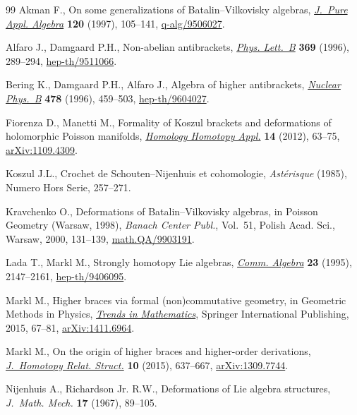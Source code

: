 \documentclass[11pt]{article}
\numberwithin{equation}{section}
\begin{document}
\begin{thebibliography}{99}
Akman F., On some generalizations of {B}atalin--{V}ilkovisky algebras,
 \href{http://dx.doi.org/10.1016/S0022-4049(96)00036-9}{\textit{J.~Pure Appl. Algebra}} \textbf{120} (1997), 105--141,
 \href{http://arxiv.org/abs/q-alg/9506027}{q-alg/9506027}.

Alfaro J., Damgaard P.H., Non-abelian antibrackets, \href{http://dx.doi.org/10.1016/0370-2693(95)01533-7}{\textit{Phys. Lett.~B}}
 \textbf{369} (1996), 289--294, \href{http://arxiv.org/abs/hep-th/9511066}{hep-th/9511066}.

Bering K., Damgaard P.H., Alfaro J., Algebra of higher antibrackets,
 \href{http://dx.doi.org/10.1016/0550-3213(96)00401-4}{\textit{Nuclear Phys.~B}} \textbf{478} (1996), 459--503,
 \href{http://arxiv.org/abs/hep-th/9604027}{hep-th/9604027}.

Fiorenza D., Manetti M., Formality of {K}oszul brackets and deformations of
 holomorphic {P}oisson manifolds, \href{http://dx.doi.org/10.4310/HHA.2012.v14.n2.a4}{\textit{Homology Homotopy Appl.}} \textbf{14}
 (2012), 63--75, \href{http://arxiv.org/abs/1109.4309}{arXiv:1109.4309}.

Koszul J.L., Crochet de {S}chouten--{N}ijenhuis et cohomologie,
 \textit{Ast\'erisque} (1985), {N}umero Hors Serie, 257--271.

Kravchenko O., Deformations of {B}atalin--{V}ilkovisky algebras, in Poisson
 {G}eometry ({W}arsaw, 1998), \textit{Banach Center Publ.}, Vol.~51, Polish
 Acad. Sci., Warsaw, 2000, 131--139, \href{http://arxiv.org/abs/math.QA/9903191}{math.QA/9903191}.

Lada T., Markl M., Strongly homotopy {L}ie algebras, \href{http://dx.doi.org/10.1080/00927879508825335}{\textit{Comm. Algebra}}
 \textbf{23} (1995), 2147--2161, \href{http://arxiv.org/abs/hep-th/9406095}{hep-th/9406095}.

Markl M., Higher braces via formal (non)commutative geometry, in Geometric
 {M}ethods in {P}hysics, \href{http://dx.doi.org/10.1007/978-3-319-18212-4_4}{\textit{Trends in Mathematics}}, Springer International
 Publishing, 2015, 67--81, \href{http://arxiv.org/abs/1411.6964}{arXiv:1411.6964}.

Markl M., On the origin of higher braces and higher-order derivations,
 \href{http://dx.doi.org/10.1007/s40062-014-0079-2}{\textit{J.~Homotopy Relat. Struct.}} \textbf{10} (2015), 637--667,
 \href{http://arxiv.org/abs/1309.7744}{arXiv:1309.7744}.

Nijenhuis A., Richardson Jr. R.W., Deformations of {L}ie algebra structures,
 \textit{J.~Math. Mech.} \textbf{17} (1967), 89--105.

\end{thebibliography}
\end{document}
